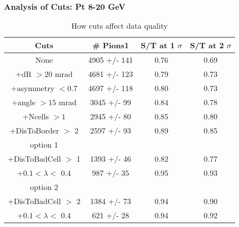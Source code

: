 \frame
{
\frametitle{Analysis of Cuts: Pt 8-20 GeV}
\begin{table}
\caption{How cuts affect data quality}
\centering
\begin{tabular}{c c c c}
\hline\hline
Cuts & \# Pions1 & S/T at 1 $\sigma$ & S/T at 2 $\sigma$ \\ [0.5ex]
\hline
None & 4905 +/-  141 & 0.76 & 0.69 \\ %
+dR $> 20$ mrad & 4681 +/-  123 & 0.79 & 0.73 \\ %
+asymmetry $< 0.7$ & 4697 +/-  118 & 0.80 & 0.73 \\ %
+angle $> 15$ mrad & 3045 +/-   99 & 0.84 & 0.78 \\ %
+Ncells $> 1$& 2945 +/-   80 & 0.85 & 0.80 \\ %
+DisToBorder $>$ 2 & 2597 +/-   93 & 0.89 & 0.85 \\ %
option 1\\
+DisToBadCell $>$ 1& 1393 +/-   46 & 0.82 & 0.77 \\ %
+$0.1 < \lambda <$ 0.4 &  987 +/-   35 & 0.95 & 0.93 \\ %
option 2\\
+DisToBadCell $>$ 2& 1384 +/-   73 & 0.94 & 0.90 \\ %
+$0.1 < \lambda <$ 0.4 &  621 +/-   28 & 0.94 & 0.92 \\ %
[1ex]
\hline
\end{tabular}
\label{table:nonlin}
\end{table}
}
